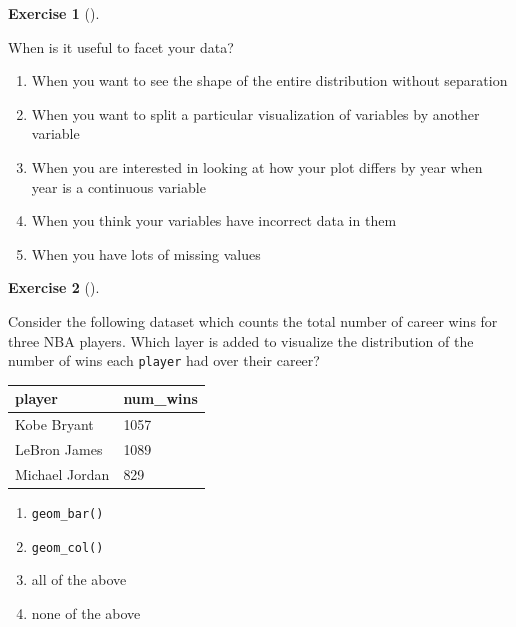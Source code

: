 \documentclass[
  letterpaper,
  DIV=11,
  numbers=noendperiod]{scrreprt}
\providecommand{\tightlist}{%
  \setlength{\itemsep}{0pt}\setlength{\parskip}{0pt}}\usepackage{longtable,booktabs,array}
\theoremstyle{definition}
\newtheorem{exercise}{Exercise}[chapter]
\theoremstyle{remark}
\begin{document}
\leavevmode{}%
\begin{exercise}[]\label{exr-ch02-c04}

When is it useful to facet your data?

\begin{enumerate}
\def\labelenumi{\alph{enumi})}
\tightlist
\item
  When you want to see the shape of the entire distribution without
  separation
\item
  When you want to split a particular visualization of variables by
  another variable
\item
  When you are interested in looking at how your plot differs by year
  when year is a continuous variable
\item
  When you think your variables have incorrect data in them
\item
  When you have lots of missing values
\end{enumerate}

\end{exercise}

\leavevmode{}%
\begin{exercise}[]\label{exr-ch02-c05}

Consider the following dataset which counts the total number of career
wins for three NBA players. Which layer is added to visualize the
distribution of the number of wins each \texttt{player} had over their
career?

\begin{longtable}[]{@{}ll@{}}
\toprule()
player & num\_wins \\
\midrule()
\endhead
Kobe Bryant & 1057 \\
LeBron James & 1089 \\
Michael Jordan & 829 \\
\bottomrule()
\end{longtable}

\begin{enumerate}
\def\labelenumi{\alph{enumi})}
\tightlist
\item
  \texttt{geom\_bar()}
\item
  \texttt{geom\_col()}
\item
  all of the above
\item
  none of the above
\end{enumerate}

\end{exercise}
\end{document}
